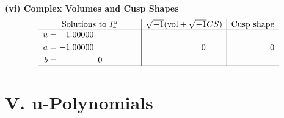 \documentclass[1p]{elsarticle_modified}
\theoremstyle{definition}
\newcommand{\I}{\sqrt{-1}}
\begin{document}
\newpage\flushleft \textbf{(vi) Complex Volumes and Cusp Shapes}
$$\begin{array}{c|c|c}  
\text{Solutions to }I^u_{4}& \I (\text{vol} + \sqrt{-1}CS) & \text{Cusp shape}\\
 \hline 
\begin{aligned}
u &= -1.00000\phantom{ +0.000000I} \\
a &= -1.00000\phantom{ +0.000000I} \\
b &= \phantom{-0.000000 } 0\end{aligned}
 & \phantom{-0.000000 } 0 & \phantom{-0.000000 } 0\\
 \hline 
 \end{array}$$\newpage
\newpage\renewcommand{\arraystretch}{1}
\centering \section*{ V. u-Polynomials}
\end{document}
